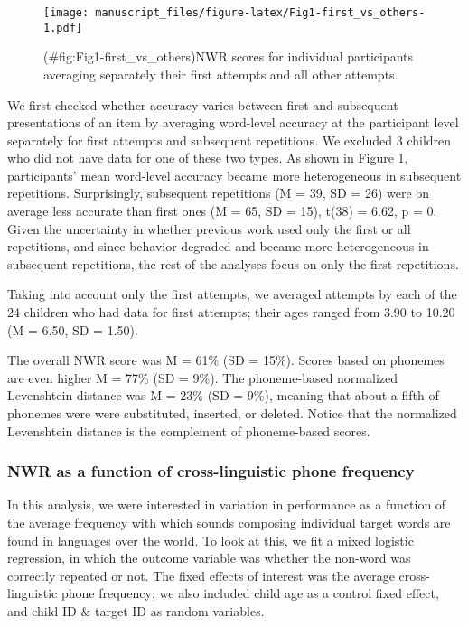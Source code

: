 \documentclass[english,,man,floatsintext]{apa6}
\begin{document}
\begin{figure}
\centering
\texttt{[image: manuscript\_files/figure-latex/Fig1-first\_vs\_others-1.pdf]}
\caption{(\#fig:Fig1-first\_vs\_others)NWR scores for individual
participants averaging separately their first attempts and all other
attempts.}
\end{figure}

We first checked whether accuracy varies between first and subsequent
presentations of an item by averaging word-level accuracy at the
participant level separately for first attempts and subsequent
repetitions. We excluded 3 children who did not have data for one of
these two types. As shown in Figure 1, participants' mean word-level
accuracy became more heterogeneous in subsequent repetitions.
Surprisingly, subsequent repetitions (M = 39, SD = 26) were on average
less accurate than first ones (M = 65, SD = 15), t(38) = 6.62, p = 0.
Given the uncertainty in whether previous work used only the first or
all repetitions, and since behavior degraded and became more
heterogeneous in subsequent repetitions, the rest of the analyses focus
on only the first repetitions.

Taking into account only the first attempts, we averaged attempts by
each of the 24 children who had data for first attempts; their ages
ranged from 3.90 to 10.20 (M = 6.50, SD = 1.50).

The overall NWR score was M = 61\% (SD = 15\%). Scores based on phonemes
are even higher M = 77\% (SD = 9\%). The phoneme-based normalized
Levenshtein distance was M = 23\% (SD = 9\%), meaning that about a fifth
of phonemes were were substituted, inserted, or deleted. Notice that the
normalized Levenshtein distance is the complement of phoneme-based
scores.

\subsubsection{NWR as a function of cross-linguistic phone
frequency}\label{nwr-as-a-function-of-cross-linguistic-phone-frequency}

In this analysis, we were interested in variation in performance as a
function of the average frequency with which sounds composing individual
target words are found in languages over the world. To look at this, we
fit a mixed logistic regression, in which the outcome variable was
whether the non-word was correctly repeated or not. The fixed effects of
interest was the average cross-linguistic phone frequency; we also
included child age as a control fixed effect, and child ID \& target ID
as random variables.
\end{document}
